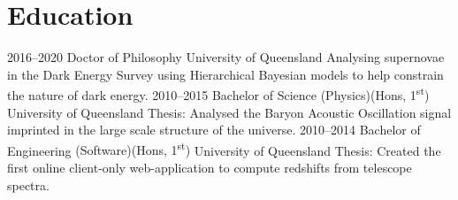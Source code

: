 \documentclass[]{friggeri-cv2}
\begin{document}

\section{Education}

\begin{entrylist}
\entry
{2016--2020}
{Doctor of Philosophy}
{University of Queensland}
{Analysing supernovae in the Dark Energy Survey using Hierarchical Bayesian models to help constrain the nature of dark energy.}
\entry
{2010--2015}
{Bachelor of Science {\normalfont (Physics)(Hons, 1\textsuperscript{st})}}
{University of Queensland}
{Thesis: Analysed the Baryon Acoustic Oscillation signal imprinted in the large scale structure of the universe.}
\entry
{2010--2014}
{Bachelor of Engineering {\normalfont (Software)(Hons, 1\textsuperscript{st})}}
{University of Queensland}
{Thesis: Created the first online client-only web-application to compute redshifts from telescope spectra. }
\end{entrylist}
\end{document}
